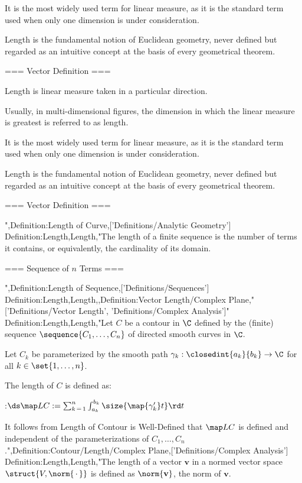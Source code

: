 It is the most widely used term for linear measure, as it is the standard term used when only one dimension is under consideration.


Length is the fundamental notion of Euclidean geometry, never defined but regarded as an intuitive concept at the basis of every geometrical theorem.


=== Vector Definition ===

Length is linear measure taken in a particular direction.

Usually, in multi-dimensional figures, the dimension in which the linear measure is greatest is referred to as length.

It is the most widely used term for linear measure, as it is the standard term used when only one dimension is under consideration.


Length is the fundamental notion of Euclidean geometry, never defined but regarded as an intuitive concept at the basis of every geometrical theorem.


=== Vector Definition ===

",Definition:Length of Curve,['Definitions/Analytic Geometry']
Definition:Length,Length,"The length of a finite sequence is the number of terms it contains, or equivalently, the cardinality of its domain.


=== Sequence of $n$ Terms ===

",Definition:Length of Sequence,['Definitions/Sequences']
Definition:Length,Length,,Definition:Vector Length/Complex Plane,"['Definitions/Vector Length', 'Definitions/Complex Analysis']"
Definition:Length,Length,"Let $C$ be a contour in $\C$ defined by the (finite) sequence $\sequence {C_1, \ldots, C_n}$ of directed smooth curves in $\C$.

Let $C_k$ be parameterized by the smooth path $\gamma_k: \closedint {a_k} {b_k} \to \C$ for all $k \in \set {1, \ldots, n}$.


The length of $C$ is defined as:

:$\ds \map L C := \sum_{k \mathop = 1}^n \int_{a_k}^{b_k} \size {\map {\gamma_k'} t} \rd t$


It follows from Length of Contour is Well-Defined that $\map L C$ is defined and independent of the parameterizations of $C_1, \ldots, C_n$.",Definition:Contour/Length/Complex Plane,['Definitions/Complex Analysis']
Definition:Length,Length,"The length of a vector $\mathbf v$ in a normed vector space $\struct {V, \norm {\, \cdot \,} }$ is defined as $\norm {\mathbf v}$, the norm of $\mathbf v$.


